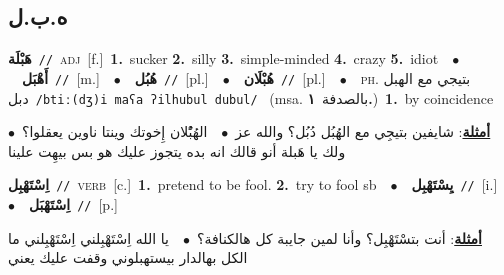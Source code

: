 \documentclass[10pt,a4paper,twoside]{article} %
\begin{document}
\begin{multicols}{2}
{{{{{\vspace{-3mm}
\subsection*{\color{blue}\foreignlanguage{arabic}{ه.ب.ل}\color{blue}{}} 

{\setlength\topsep{0pt}\textbf{\foreignlanguage{arabic}{هَبْلَة}}\ {\color{gray}\texttt{//}\color{black}}\ \textsc{adj}\ [f.]\ \textbf{1.}~sucker  \textbf{2.}~silly  \textbf{3.}~simple-minded  \textbf{4.}~crazy  \textbf{5.}~idiot\ \ $\bullet$\ \ \setlength\topsep{0pt}\textbf{\foreignlanguage{arabic}{أَهْبَل}}\ {\color{gray}\texttt{//}\color{black}}\ [m.]\ \ $\bullet$\ \ \setlength\topsep{0pt}\textbf{\foreignlanguage{arabic}{هُبُل}}\ {\color{gray}\texttt{//}\color{black}}\ [pl.]\ \ $\bullet$\ \ \setlength\topsep{0pt}\textbf{\foreignlanguage{arabic}{هُبْلَان}}\ {\color{gray}\texttt{//}\color{black}}\ [pl.]\ \ $\bullet$\ \ \textsc{ph.} \color{gray} \foreignlanguage{arabic}{بتيجي مع الهبل دبل}\color{black}\ {\color{gray}\texttt{/{\sffamily btiː(dʒ)i maʕa ʔilhubul dubul}/}\color{black}}\ \color{gray} (msa. \foreignlanguage{arabic}{بالصدفة}~\foreignlanguage{arabic}{\textbf{١.}})\color{black}\ \textbf{1.}~by coincidence\  \begin{flushright}\color{gray}\foreignlanguage{arabic}{\textbf{\underline{\foreignlanguage{arabic}{أمثلة}}}: شايفين بتيجِي مع الهُبُل دُبُل؟ والله عز\ $\bullet$\ \  الهُبُْلان إِخوتك وينتا ناوين يعقلوا؟\ $\bullet$\ \  ولك يا هَبلة أنو قالك انه بده يتجوز عليك هو بس بيهِت علينا}\end{flushright}\color{black}} \vspace{2mm}

{\setlength\topsep{0pt}\textbf{\foreignlanguage{arabic}{اِسْتَهْبِل}}\ {\color{gray}\texttt{//}\color{black}}\ \textsc{verb}\ [c.]\ \textbf{1.}~pretend to be fool.  \textbf{2.}~try to fool sb\ \ $\bullet$\ \ \setlength\topsep{0pt}\textbf{\foreignlanguage{arabic}{يِسْتَهْبِل}}\ {\color{gray}\texttt{//}\color{black}}\ [i.]\ \ $\bullet$\ \ \setlength\topsep{0pt}\textbf{\foreignlanguage{arabic}{اِسْتَهْبَل}}\ {\color{gray}\texttt{//}\color{black}}\ [p.]\  \begin{flushright}\color{gray}\foreignlanguage{arabic}{\textbf{\underline{\foreignlanguage{arabic}{أمثلة}}}: أنت بتسْتَهْبِل؟ وأنا لمين جايبة كل هالكنافة؟\ $\bullet$\ \  يا الله اِسْتَهْبِلني اِسْتَهْبِلني ما الكل بهالدار بيستهبلوني وقفت عليك يعني}\end{flushright}\color{black}} \vspace{2mm}

}}}}}
\end{multicols}
\end{document}
